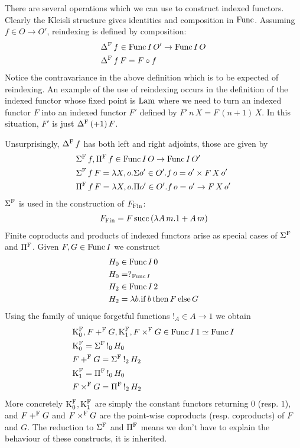 \documentclass[10pt, conference, compsocconf]{IEEEtran}
\begin{document}
There are several operations which we can use to construct indexed
functors. Clearly the Kleisli structure gives identities and
composition in $\mathrm{Func}$. Assuming $f\in O\to O'$, reindexing 
is defined by composition:
\begin{align*}
  & \Delta^\mathrm{F}\,f \in \mathrm{Func}\,I\,O' \to \mathrm{Func}\,I\,O\\
  & \Delta^\mathrm{F}\,f\,F = F \circ f
\end{align*}
Notice the contravariance in the above definition which is to be
expected of reindexing. An example of the use of
reindexing occurs in the definition of the indexed functor whose
fixed point is $\mathrm{Lam}$ where we need to turn an indexed functor $F$
into an indexed functor $F'$ defined by $F'\,n\,X = F\,(n+1)\,X$. In
this situation, $F'$ is just $\Delta^\mathrm{F}\,(+1)\,F$.

Unsurprisingly, $\Delta^\mathrm{F}\,f$ has both left and right adjoints, those
are given by 
\begin{align*}
  &\Sigma^\mathrm{F}\,f,\Pi^\mathrm{F}\,f \in \mathrm{Func}\,I\,O \to \mathrm{Func}\,I\,O'\\
  &\Sigma^\mathrm{F}\,f\,F = \lambda X,o.\Sigma o'\in O'.f\,o = o' \times
  F\,X\,o'\\
  &\Pi^\mathrm{F}\,f\,F = 
  \lambda X,o.\Pi o'\in O'.f\,o = o' \to
  F\,X\,o'
\end{align*}
$\Sigma^\mathrm{F}$ is used in the construction of $F_{\mathrm{Fin}}$:
\begin{gather*}
F_{\mathrm{Fin}} = F\,\mathrm{succ}\,(\lambda A\,m.1 + A\,m)
\end{gather*}
Finite coproducts and products of indexed functors arise as special
cases of $\Sigma^\mathrm{F}$ and $\Pi^\mathrm{F}$. Given $F,G \in \mathrm{Func}\,I$ we construct
\begin{align*}
  &H_0 \in \mathrm{Func}\,I\,0\\
  &H_0 = ?_{\mathrm{Func}\,I}\\
  &H_2 \in \mathrm{Func}\,I\,2\\
  &H_2 = \lambda b.\mathrm{if}\,b\,\mathrm{then}\,F\,\mathrm{else}\,G 
\end{align*}
Using the family of unique forgetful functions $!_A\in A \to 1$ we obtain
\begin{align*}
  &\textrm{K}^\mathrm{F}_0,F +^\mathrm{F} G, \textrm{K}^\mathrm{F}_1, F\times^\mathrm{F} G \in \mathrm{Func}\, I\,1 \simeq \mathrm{Func}\,I\\
  &\textrm{K}^\mathrm{F}_0 = \Sigma^\mathrm{F}\,!_0\,H_0\\
  &F +^\mathrm{F} G = \Sigma^\mathrm{F}\,!_2\,H_2\\
  &\textrm{K}^\mathrm{F}_1 = \Pi^\mathrm{F}\,!_0\,H_0\\
  &F \times^\mathrm{F} G = \Pi^\mathrm{F}\,!_2\,H_2
\end{align*}
More concretely $\textrm{K}^\mathrm{F}_0,\textrm{K}^\mathrm{F}_1$ are simply the constant functors
returning $0$ (resp. $1$), and $F+^\mathrm{F} G$ and $F\times^\mathrm{F} G$ are the point-wise
coproducts (resp. coproducts) of $F$ and $G$. The reduction to $\Sigma^\mathrm{F}$ and 
$\Pi^\mathrm{F}$ means we don't have to explain the behaviour of these constructs, it
is inherited.
\end{document}
